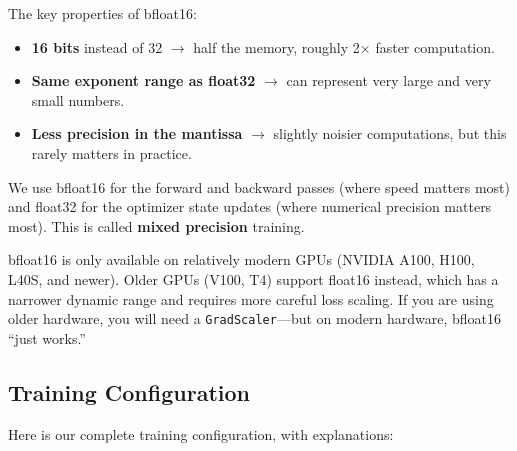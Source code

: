 \documentclass[11pt,a4paper]{article}
\begin{document}
The key properties of bfloat16:
\begin{itemize}
    \item \textbf{16 bits} instead of 32 $\rightarrow$ half the memory, roughly 2$\times$ faster computation.
    \item \textbf{Same exponent range as float32} $\rightarrow$ can represent very large and very small numbers.
    \item \textbf{Less precision in the mantissa} $\rightarrow$ slightly noisier computations, but this rarely matters in practice.
\end{itemize}

We use bfloat16 for the forward and backward passes (where speed matters most) and float32 for the optimizer state updates (where numerical precision matters most). This is called \textbf{mixed precision} training.

\begin{tip}
bfloat16 is only available on relatively modern GPUs (NVIDIA A100, H100, L40S, and newer). Older GPUs (V100, T4) support float16 instead, which has a narrower dynamic range and requires more careful loss scaling. If you are using older hardware, you will need a \texttt{GradScaler}---but on modern hardware, bfloat16 ``just works.''
\end{tip}

\subsection{Training Configuration}

Here is our complete training configuration, with explanations:
\end{document}
